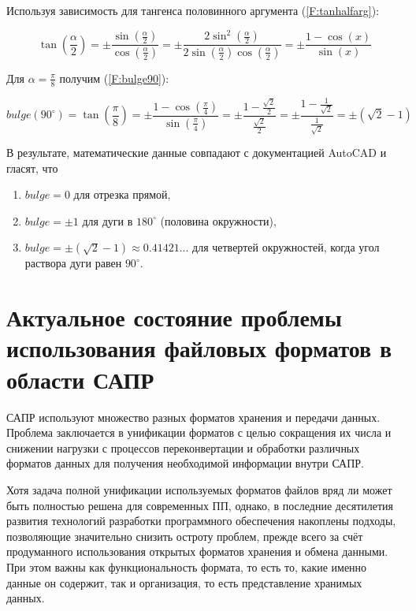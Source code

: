 Используя зависимость для тангенса половинного аргумента (\ref{F:tanhalfarg}):

\begin{equation}
	\tan(\frac{\alpha}{2})=\pm\frac{\sin(\frac{\alpha}{2})}{\cos(\frac{\alpha}{2})}=\pm\frac{2\sin^2(\frac{\alpha}{2})}{2\sin(\frac{\alpha}{2})\cos(\frac{\alpha}{2})}=\pm\frac{1-\cos(x)}{\sin(x)}
	\label{F:tanhalfarg}
\end{equation}

Для $\alpha=\frac{\pi}{8}$ получим (\ref{F:bulge90}):

\begin{equation}
	bulge(90^{\circ})=\tan(\frac{\pi}{8})=\pm\frac{1-\cos(\frac{\pi}{4})}{\sin(\frac{\pi}{4})}=\pm\frac{1-\frac{\sqrt2}{2}}{\frac{\sqrt2}{2}}=\pm\frac{1-\frac{1}{\sqrt2}}{\frac{1}{\sqrt2}}=\pm(\sqrt2-1)
	\label{F:bulge90}
\end{equation}



В результате, математические данные совпадают с документацией AutoCAD \cite{autocad2012dxf} и гласят, что

\begin{enumerate}
	\item $bulge = 0$ для отрезка прямой,
	\item $bulge = \pm1$ для дуги в $180^{\circ}$ (половина окружности),
	\item $bulge = \pm(\sqrt2-1) \approx0.41421...$ для четвертей окружностей, когда угол раствора дуги равен $90^{\circ}$.
\end{enumerate}

\section{Актуальное состояние проблемы использования файловых форматов в области САПР} \label{sec:actual}

САПР используют множество разных форматов хранения и передачи данных. Проблема заключается в унификации форматов с целью сокращения их числа и снижении нагрузки с процессов переконвертации и обработки различных форматов данных для получения необходимой информации внутри САПР.

Хотя задача полной унификации используемых форматов файлов вряд ли может быть полностью решена для современных  ПП, однако, в последние десятилетия развития технологий разработки программного обеспечения накоплены подходы, позволяющие значительно снизить остроту проблем, прежде всего за счёт продуманного использования открытых форматов хранения и обмена данными. При этом важны как функциональность формата, то есть то, какие именно данные он содержит, так и организация, то есть представление хранимых данных.

